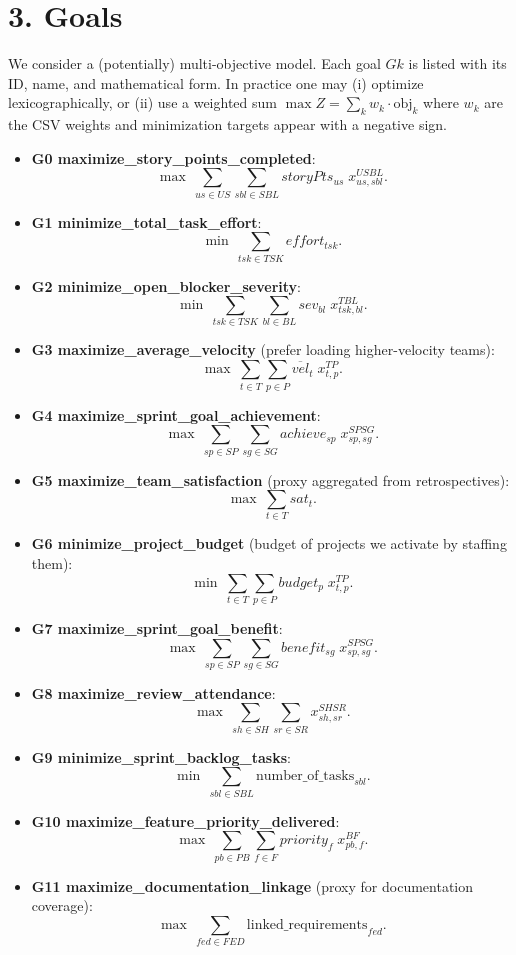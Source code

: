 \documentclass[11pt]{article}
\begin{document}
\section{3. Goals}
We consider a (potentially) multi-objective model. Each goal $Gk$ is listed with its ID, name, and mathematical form. In practice one may (i) optimize lexicographically, or (ii) use a weighted sum $\max Z=\sum_k w_k \cdot \text{obj}_k$ where $w_k$ are the CSV weights and minimization targets appear with a negative sign.

\begin{itemize}
  \item \textbf{G0 maximize\_story\_points\_completed}: 
  \[
    \max~ \sum_{us\in US}\sum_{sbl\in SBL} storyPts_{us}\; x^{USBL}_{us,sbl}.
  \]
  \item \textbf{G1 minimize\_total\_task\_effort}:
  \[
    \min~ \sum_{tsk\in TSK} effort_{tsk}.
  \]
  \item \textbf{G2 minimize\_open\_blocker\_severity}:
  \[
    \min~ \sum_{tsk\in TSK}\sum_{bl\in BL} sev_{bl}\; x^{TBL}_{tsk,bl}.
  \]
  \item \textbf{G3 maximize\_average\_velocity} (prefer loading higher-velocity teams):
  \[
    \max~ \sum_{t\in T}\sum_{p\in P} \overline{vel}_t \; x^{TP}_{t,p}.
  \]
  \item \textbf{G4 maximize\_sprint\_goal\_achievement}:
  \[
    \max~ \sum_{sp\in SP}\sum_{sg\in SG} achieve_{sp}\; x^{SPSG}_{sp,sg}.
  \]
  \item \textbf{G5 maximize\_team\_satisfaction} (proxy aggregated from retrospectives):
  \[
    \max~ \sum_{t\in T} sat_t.
  \]
  \item \textbf{G6 minimize\_project\_budget} (budget of projects we activate by staffing them):
  \[
    \min~ \sum_{t\in T}\sum_{p\in P} budget_p \; x^{TP}_{t,p}.
  \]
  \item \textbf{G7 maximize\_sprint\_goal\_benefit}:
  \[
    \max~ \sum_{sp\in SP}\sum_{sg\in SG} benefit_{sg}\; x^{SPSG}_{sp,sg}.
  \]
  \item \textbf{G8 maximize\_review\_attendance}:
  \[
    \max~ \sum_{sh\in SH}\sum_{sr\in SR} x^{SHSR}_{sh,sr}.
  \]
  \item \textbf{G9 minimize\_sprint\_backlog\_tasks}:
  \[
    \min~ \sum_{sbl\in SBL} \text{number\_of\_tasks}_{sbl}.
  \]
  \item \textbf{G10 maximize\_feature\_priority\_delivered}:
  \[
    \max~ \sum_{pb\in PB}\sum_{f\in F} priority_f\; x^{BF}_{pb,f}.
  \]
  \item \textbf{G11 maximize\_documentation\_linkage} (proxy for documentation coverage):
  \[
    \max~ \sum_{fed\in FED} \text{linked\_requirements}_{fed}.
  \]
\end{itemize}
\end{document}
